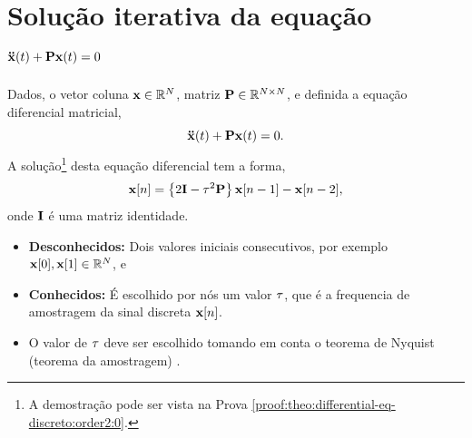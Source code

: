 \section{ Solução iterativa da equação $\DDTVECTOR{x}(t) + \MATRIX{P} \VECTOR{x}(t)=0$ }

\begin{theorem}[Equação 
$\DDTVECTOR{x}(t) + \MATRIX{P} \VECTOR{x}(t)=0$ com diferenças finitas:]
\label{theo:differential-eq-discreto:order2:0}
Dados, o vetor coluna $\VECTOR{x} \in \mathbb{R}^N$, matriz $\MATRIX{P} \in \mathbb{R}^{N\times N}$, 
e definida a equação diferencial matricial,
\begin{equation}\label{eq:theo:secondorder:1}
\DDTVECTOR{x}(t) + \MATRIX{P} \VECTOR{x}(t)=0.
\end{equation}
A solução\footnote{A
demostração pode ser vista na Prova \ref{proof:theo:differential-eq-discreto:order2:0}.} desta equação diferencial tem  a forma,
\begin{equation}\label{eq:theo:secondorder:2}
  \VECTOR{x}[n]=\left\{2\MATRIX{I} - \ToS^2 \MATRIX{P}\right\}\VECTOR{x}[n-1]-\VECTOR{x}[n-2],
\end{equation}
onde $\MATRIX{I}$ é uma matriz identidade.
\begin{itemize}
\item \textbf{Desconhecidos:} Dois valores iniciais consecutivos, por exemplo $\VECTOR{x}[0],\VECTOR{x}[1] \in \mathbb{R}^{N}$, e
\item  \textbf{Conhecidos:} É escolhido por nós um valor $\tau$, 
que é a frequencia de amostragem da sinal discreta $\VECTOR{x}[n]$.
\end{itemize}
\end{theorem}

\begin{tcbattention}
\begin{itemize}
\item O valor de $\tau$ deve ser escolhido tomando em conta o teorema de Nyquist (teorema da amostragem) 
\cite[pp. 67]{rochol2009comunicacao} \cite[pp. 122]{forouzan2009comunicacao}.
\end{itemize}
\end{tcbattention}

